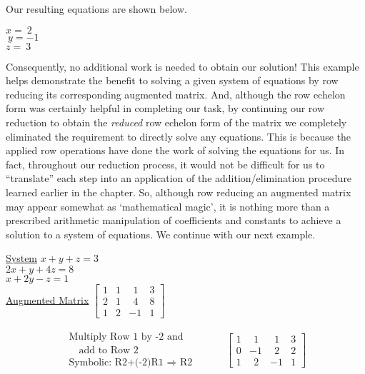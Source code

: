 Our resulting equations are shown below.
\begin{center}
$x=~2$\\
$~y=-1$\\
$z=~3$
\end{center}
Consequently, no additional work is needed to obtain our solution!\pp
This example helps demonstrate the benefit to solving a given system of equations by row reducing its corresponding augmented matrix.  And, although the row echelon form was certainly helpful in completing our task, by continuing our row reduction to obtain the \textit{reduced} row echelon form of the matrix we completely eliminated the requirement to directly solve any equations.\pp
This is because the applied row operations have done the work of solving the equations for us.  In fact, throughout our reduction process, it would not be difficult for us to ``translate'' each step into an application of the addition/elimination procedure learned earlier in the chapter.  So, although row reducing an augmented matrix may appear somewhat as `mathematical magic', it is nothing more than a prescribed arithmetic manipulation of coefficients and constants to achieve a solution to a system of equations.\pp
We continue with our next example.
\newpage
\begin{example}
\end{example}
\begin{center}
\begin{multicols}{2}
\underline{System}\pp
$x+y+z=3$\\
$2x+y+4z=8$\\
$x+2y-z=1$\\
\underline{Augmented Matrix}\pp
$\left[\begin{array}{ccc|c}
1 & 1 & ~~1 & 3\\
2 & 1 & ~~4 & 8\\
1 & 2 & -1 & 1
\end{array}\right]$
\end{multicols}
\end{center}

\begin{eqnarray*}
\begin{array}{l}
\text{Multiply Row 1 by -2 and}\\
\text{~~~add to Row 2}\\
\text{Symbolic: R2+(-2)R1~}\Rightarrow \text{~R2}
\end{array}
&&
~~~~~~\left[
\begin{array}{ccc|c}
1 & ~~1 & ~~1 & 3\\
0 & -1 & ~~2 & 2\\
1 & ~~2 & -1 & 1
\end{array}
\right]
\end{eqnarray*}

